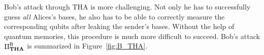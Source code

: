 Bob's attack through THA is more challenging. Not only he has to successfully guess \textit{all} Alices's bases, he also has to be able to correctly measure the corresponding qubits after leaking the sender's bases. Without the help of quantum memories, this procedure is much more difficult to succeed. %
Bob's attack $\rotPi^{\mathsf{B}}_{\textbf{THA}}$ is summarized in Figure~\ref{fig:B_THA}.








